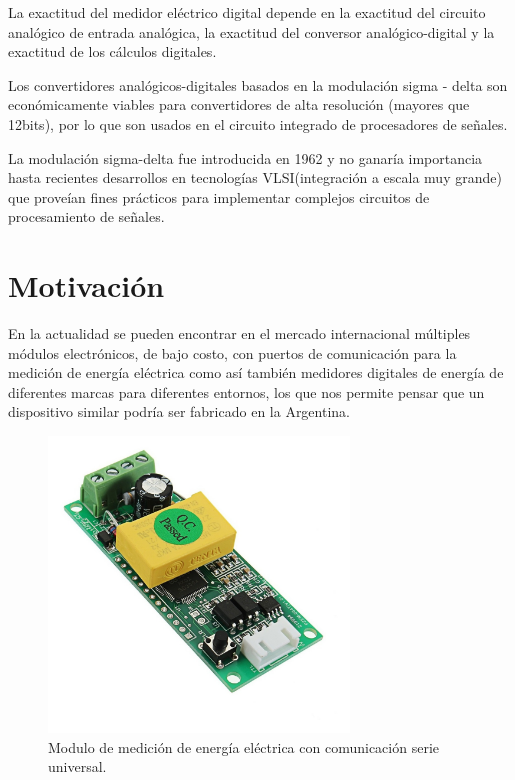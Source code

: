 La exactitud del medidor eléctrico digital depende en la exactitud del circuito analógico de entrada analógica, la exactitud del conversor analógico-digital y la exactitud de los cálculos digitales.\citep{Hribik2004DigitalPA}

Los convertidores analógicos-digitales basados en la modulación sigma - delta son económicamente viables para convertidores de alta resolución (mayores que 12bits), por lo que son  usados en el circuito integrado de procesadores de señales.

La modulación sigma-delta fue introducida en 1962 y no ganaría importancia hasta recientes desarrollos en tecnologías VLSI(integración a escala muy grande) que proveían fines prácticos para implementar complejos circuitos de procesamiento de señales.\citep{book:28601}



\section{Motivación}

En la actualidad se pueden encontrar en el mercado internacional múltiples módulos electrónicos, de bajo costo, con puertos de comunicación para la medición de energía eléctrica como así también medidores digitales de energía de diferentes marcas para diferentes entornos, los que nos permite pensar que un dispositivo similar podría ser fabricado en la Argentina.

\begin{figure}[h]
	\centering
	\includegraphics[width=80mm,keepaspectratio]{Figures/pzeem004.jpg}
	\caption{Modulo de medición de energía eléctrica con comunicación serie universal.}
	\label{fig:pzem04}
\end{figure}

